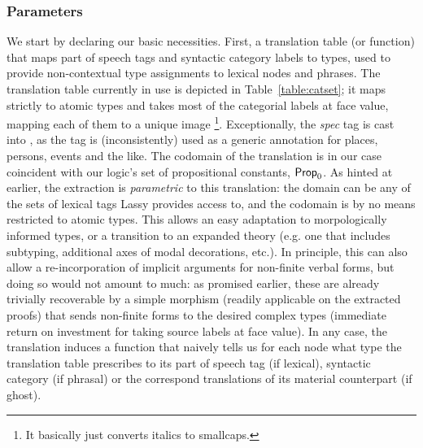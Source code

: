 \subsubsection{Parameters}
We start by declaring our basic necessities.
First, a translation table (or function) that maps part of speech tags and syntactic category labels to types, used to provide non-contextual type assignments to lexical nodes and phrases.
The translation table currently in use is depicted in Table~\ref{table:catset}; it maps strictly to atomic types and takes most of the categorial labels at face value, mapping each of them to a unique image%
\footnote{It basically just converts italics to smallcaps.}.
Exceptionally, the \textit{spec} tag is cast into , as the tag is (inconsistently) used as a generic annotation for places, persons, events and the like.
The codomain of the translation is in our case coincident with our logic's set of propositional constants, $\mathsf{Prop}_0$.
As hinted at earlier, the extraction is \textit{parametric} to this translation: the domain can be any of the sets of lexical tags Lassy provides access to, and the codomain is by no means restricted to atomic types.
This allows an easy adaptation to morpologically informed types, or a transition to an expanded theory (e.g. one that includes subtyping, additional axes of modal decorations, etc.). 
In principle, this can also allow a re-incorporation of implicit arguments for non-finite verbal forms, but doing so would not amount to much: as promised earlier, these are already trivially recoverable by a simple morphism (readily applicable on the extracted proofs) that sends non-finite forms to the desired complex types (immediate return on investment for taking source labels at face value).
In any case, the translation induces a function that naively tells us for each node what type the translation table prescribes to its part of speech tag (if lexical), syntactic category (if phrasal) or the correspond translations of its material counterpart (if ghost).

